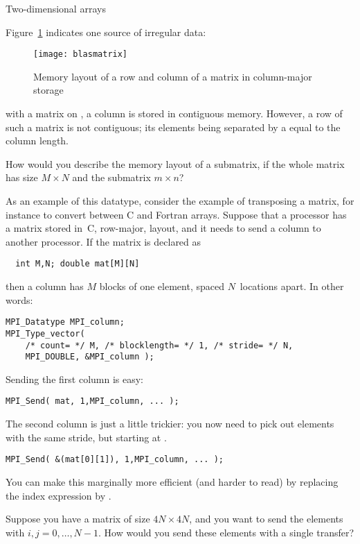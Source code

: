  {Two-dimensional arrays}

Figure~\ref{fig:blasmatrix} indicates one source of irregular
data:
%
\begin{figure}[t]
  \texttt{[image: blasmatrix]}
  \caption{Memory layout of a row and column of a matrix in column-major storage}
  \label{fig:blasmatrix}
\end{figure}
%
with a matrix on , a column is
stored in contiguous memory. However, a row of such a matrix
is not contiguous; its elements being separated by a 
equal to the column length.

\begin{exercise}
  \label{ex:submatrix}
  How would you describe the memory layout of a submatrix,
  if the whole matrix has size $M\times N$ and the submatrix $m\times n$?
\end{exercise}

As an example of this datatype, consider the example of transposing
a matrix, for instance to convert between
C and Fortran arrays.
Suppose that 
a processor has a matrix stored in~C, row-major, layout, and it needs
to send a column to another processor. If the matrix is declared as
\begin{lstlisting}
  int M,N; double mat[M][N]
\end{lstlisting}
then a column has $M$ blocks of one element, spaced $N$~locations apart.
In other words:
\begin{lstlisting}
MPI_Datatype MPI_column;
MPI_Type_vector( 
    /* count= */ M, /* blocklength= */ 1, /* stride= */ N,
    MPI_DOUBLE, &MPI_column );
\end{lstlisting}
Sending the first column is easy:
\begin{lstlisting}
MPI_Send( mat, 1,MPI_column, ... );
\end{lstlisting}
The second column is just a little trickier: you now need to pick out 
elements with the same stride, but starting at .
\begin{lstlisting}
MPI_Send( &(mat[0][1]), 1,MPI_column, ... );
\end{lstlisting}
You can make this marginally more efficient (and harder to read)
by replacing the index expression by .

\begin{exercise}
  Suppose you have a matrix of size $4N\times 4N$, and you want to
  send the elements  with $i,j=0,\ldots,N-1$. How would
  you send these elements with a single transfer?
\end{exercise}

